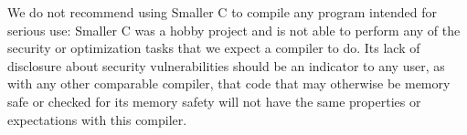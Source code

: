 \documentclass[sigconf, anonymous]{acmart}
\begin{document}
We do not recommend using Smaller C to compile any program intended for serious use: Smaller C was a hobby project and is not able to perform any of the security or optimization tasks that we expect a compiler to do. Its lack of disclosure about security vulnerabilities should be an indicator to any user, as with any other comparable compiler, that code that may otherwise be memory safe or checked for its memory safety will not have the same properties or expectations with this compiler.

\balance
\end{document}
